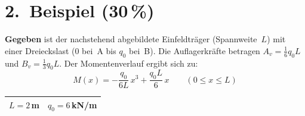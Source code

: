 \documentclass[a4paper,11pt]{article}
\begin{document}
\newpage
\section*{2.~Beispiel \hfill (30\,\%)}

\textbf{Gegeben} ist der nachstehend abgebildete Einfeldträger (Spannweite~$L$)
mit einer Dreieckslast (0 bei~A bis $q_0$ bei~B).
Die Auflagerkräfte betragen $A_v = \tfrac{1}{6}q_0 L$ und $B_v = \tfrac{1}{3}q_0 L$.
Der Momentenverlauf ergibt sich zu:
\[
  M(x) = -\frac{q_0}{6L}\,x^3 + \frac{q_0 L}{6}\,x
  \qquad (0 \le x \le L)
\]

\begin{tabular}{|c|c|}
\hline
$L = 2$\,m & $q_0 = 6$\,kN/m \\
\hline
\end{tabular}
\end{document}
